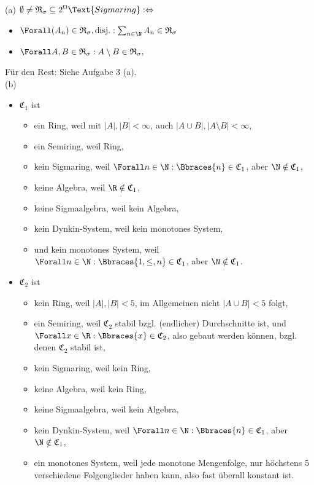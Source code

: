 \begin{solution}

(a) $\emptyset \neq \mathfrak{R}_\sigma \subseteq 2^\Omega \Text{Sigmaring} : \Leftrightarrow$
\begin{itemize}
  \item $\Forall (A_n) \in \mathfrak{R}_\sigma, \text{disj.}: \sum_{n \in \N} A_n \in \mathfrak{R}_\sigma$
  \item $\Forall A, B \in \mathfrak{R}_\sigma: A \setminus B \in \mathfrak{R}_\sigma,$
\end{itemize}

Für den Rest: Siehe Aufgabe 3 (a). \\

(b)

\begin{itemize}

  \item $\mathfrak{C}_1$ ist
  \begin{itemize}
    \item ein Ring, weil mit $|A|, |B| < \infty$, auch $|A \cup B|, |A \setminus B| < \infty$,
    \item ein Semiring, weil Ring,
    \item kein Sigmaring, weil $\Forall n \in \N: \Bbraces{n} \in \mathfrak{C}_1$, aber $\N \notin \mathfrak{C}_1$,
    \item keine Algebra, weil $\R \notin \mathfrak{C}_1$,
    \item keine Sigmaalgebra, weil kein Algebra,
    \item kein Dynkin-System, weil kein monotones System,
    \item und kein monotones System, weil $\Forall n \in \N: \Bbraces{1, \leq, n} \in \mathfrak{C}_1$, aber $\N \notin \mathfrak{C}_1$.
  \end{itemize}

  \item$\mathfrak{C}_2$ ist
  \begin{itemize}
    \item kein Ring, weil $|A|, |B| < 5$, im Allgemeinen nicht $|A \cup B| < 5$ folgt,
    \item ein Semiring, weil $\mathfrak{C}_2$ stabil bzgl. (endlicher) Durchschnitte ist, und $\Forall x \in \R: \Bbraces{x} \in \mathfrak{C}_2$, also  gebaut werden können, bzgl. denen $\mathfrak{C}_2$ stabil ist,
    \item kein Sigmaring, weil kein Ring,
    \item keine Algebra, weil kein Ring,
    \item keine Sigmaalgebra, weil kein Algebra,
    \item kein Dynkin-System, weil $\Forall n \in \N: \Bbraces{n} \in \mathfrak{C}_1$, aber $\N \notin \mathfrak{C}_1$,
    \item ein monotones System, weil jede monotone Mengenfolge, nur höchstens $5$ verschiedene Folgenglieder haben kann, also fast überall konstant ist.
  \end{itemize}


\end{itemize}
\end{solution}
